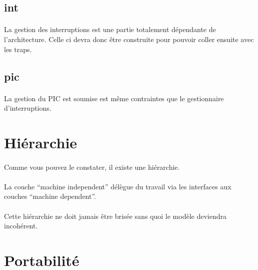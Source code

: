 \documentclass[10pt,a4wide]{article}
\begin{document}
\subsection{int}

\paragraph{}

La gestion des interruptions est une partie totalement d\'ependante de
l'architecture. Celle ci devra donc \^etre construite pour pouvoir
coller ensuite avec les traps.

\subsection{pic}

\paragraph{}

La gestion du PIC est soumise est m\^eme contraintes que le gestionnaire
d'interruptions.

\section{Hi\'erarchie}

\paragraph{}

Comme vous pouvez le constater, il existe une hi\'erarchie.

\paragraph{}

La couche ``machine independent'' d\'el\`egue du travail via les interfaces
aux couches ``machine dependent''.

\paragraph{}

Cette hi\'erarchie ne doit jamais \^etre bris\'ee sans quoi le mod\`ele
deviendra incoh\'erent.

\section{Portabilit\'e}
\end{document}
